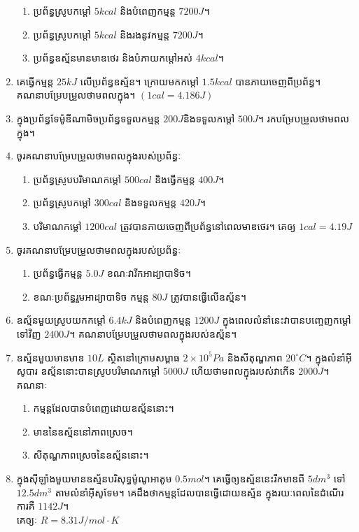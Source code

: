 \begin{enumerate}[m]
\begin{enumerate}[k]
		\item ប្រព័ន្ធស្រូបកម្តៅ $5kcal$ និងបំពេញកម្មន្ត $7200J$។
		\item ប្រព័ន្ធស្រូបកម្តៅ $5kcal$ និងរងនូវកម្មន្ត $7200J$។
		\item ប្រព័ន្ធឧស្ម័នមានមាឌថេរ និងបំភាយកម្តៅអស់ $4kcal$។
	\end{enumerate}
	\item គេធ្វើកម្មន្ត $25kJ$ លើប្រព័ន្ធឧស្ម័ន។ ក្រោយមកកម្តៅ $1.5kcal$ បានភាយចេញពីប្រព័ន្ធ។ \\គណនាបម្រែបម្រួលថាមពលក្នុង។ $\left(1cal=4.186J\right)$ 
	\item ក្នុងប្រព័ន្ធទែម៉ូឌីណាមិចប្រព័ន្ធទទួលកម្មន្ត $200J$​និងទទួលកម្តៅ $500J$។ រកបម្រែបម្រួលថាមពលក្នុង។
	\item ចូរគណនាបម្រែបម្រួលថាមពលក្នុងរបស់ប្រព័ន្ធៈ
	\begin{enumerate}[k]
		\item ប្រព័ន្ធស្រូបបរិមាណកម្តៅ $500cal$ និងធ្វើកម្មន្ត $400J$។
		\item ប្រព័ន្ធស្រូបកម្តៅ $300cal$ និងទទួលកម្មន្ត $420J$។
		\item បរិមាណកម្តៅ $1200cal$ ត្រូវបានភាយចេញពីប្រព័ន្ធនៅពេលមាឌថេរ។ គេឲ្យ $1cal=4.19J$
	\end{enumerate}
	\item ចូរគណនាបម្រែបម្រួលថាមពលក្នុងរបស់ប្រព័ន្ធៈ
	\begin{enumerate}[k]
		\item ប្រព័ន្ធធ្វើកម្មន្ត $5.0J$ ខណៈវារីកអាដ្យាបាទិច។
		\item ខណៈប្រព័ន្ធរួមអាដ្យាបាទិច កម្មន្ត $80J$ ត្រូវបានធ្វើលើឧស្ម័ន។
	\end{enumerate}
	\item ឧស្ម័នមួយស្រូបយកកម្តៅ $6.4kJ$ និងបំពេញកម្មន្ត $1200J$ ក្នុងពេលលំនាំនេះវាបានបញ្ចេញកម្តៅទៅវិញ $2400J$។ គណនាបម្រែបម្រួលថាមពលក្នុងរបស់ឧស្ម័ន។
	\item ឧស្ម័នមួយមានមាឌ $10L$ ស្ថិតនៅក្រោមសម្ពាធ $2\times10^{5}Pa$ និងសីតុណ្ហភាព $20^\circ C$។ ក្នុងលំនាំអុីសូបារ ឧស្ម័ននោះបានស្រូបបរិមាណកម្តៅ $5000J$ ហើយថាមពលក្នុងរបស់វាកើន $2000J$។ គណនាៈ
	\begin{enumerate}[k,2]
		\item កម្មន្តដែលបានបំពេញដោយឧស្ម័ននោះ។
		\item មាឌនៃឧស្ម័ននៅភាពស្រេច។
		\item សីតុណ្ហភាពស្រេចនៃឧស្ម័ននោះ។
	\end{enumerate} 
	\item ក្នុងសុីឡាំងមួយមានឧស្ម័នបរិសុទ្ធម៉ូណូអាតូម $0.5mol$។ គេធ្វើឲ្យឧស្ម័ននេះរីកមាឌពី $5dm^3$ ទៅ​ $12.5dm^3$ តាមលំនាំអុីសូទែម។ គេដឹងថាកម្មន្តដែលបានធ្វើដោយឧស្ម័ន ក្នុងរយៈពេលនៃដំណើរការគឺ $1142J$។\\គេឲ្យៈ $R=8.31J/mol\cdot K$

\end{enumerate}
